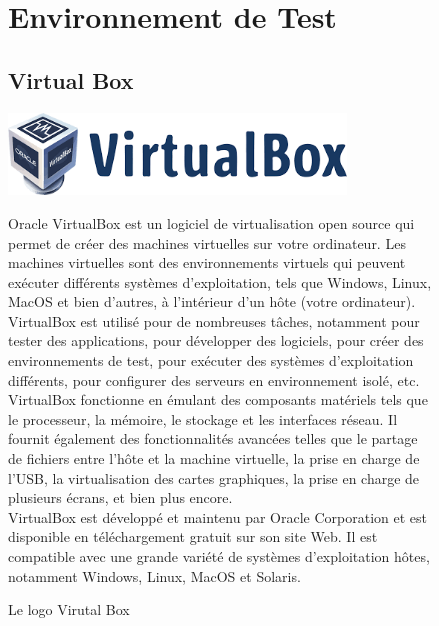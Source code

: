 \begin{figure}[h]
	\section{Environnement de Test}
	\subsection{Virtual Box}
	\begin{center}
		\includegraphics[width=0.8\textwidth]{PhotoMemoire/Virtualbox.png}
		\caption{ Le logo Virutal Box }\cite{18}
	\end{center}
	Oracle VirtualBox est un logiciel de virtualisation open source qui permet de créer des machines virtuelles sur votre ordinateur. Les machines virtuelles sont des environnements virtuels qui peuvent exécuter différents systèmes d'exploitation, tels que Windows, Linux, MacOS et bien d'autres, à l'intérieur d'un hôte (votre ordinateur).\\
	
	VirtualBox est utilisé pour de nombreuses tâches, notamment pour tester des applications, pour développer des logiciels, pour créer des environnements de test, pour exécuter des systèmes d'exploitation différents, pour configurer des serveurs en environnement isolé, etc.\\
	
	VirtualBox fonctionne en émulant des composants matériels tels que le processeur, la mémoire, le stockage et les interfaces réseau. Il fournit également des fonctionnalités avancées telles que le partage de fichiers entre l'hôte et la machine virtuelle, la prise en charge de l'USB, la virtualisation des cartes graphiques, la prise en charge de plusieurs écrans, et bien plus encore.\\
	
	VirtualBox est développé et maintenu par Oracle Corporation et est disponible en téléchargement gratuit sur son site Web. Il est compatible avec une grande variété de systèmes d'exploitation hôtes, notamment Windows, Linux, MacOS et Solaris.\\ 
\end{figure}

